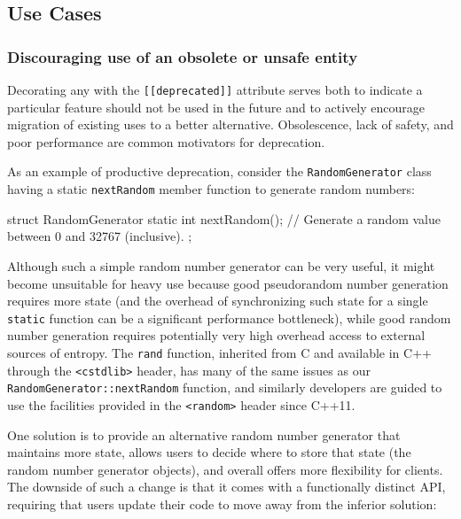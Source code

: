 \subsection[Use Cases]{Use Cases}\label{use-cases}

\subsubsection[Discouraging use of an obsolete or unsafe entity]{Discouraging use of an obsolete or unsafe entity}\label{discouraging-use-of-an-obsolete-or-unsafe-entity}

Decorating any  with the \lstinline![[deprecated]]! attribute serves both
to indicate a particular feature should not be used in the future and
to actively encourage migration of existing uses to a better
alternative. Obsolescence, lack of safety, and poor performance are
common motivators for deprecation.

As an example of productive deprecation, consider the
\lstinline!RandomGenerator! class having a static \lstinline!nextRandom!
member function to generate random numbers:

\newpage%
\begin{emcppslisting}
struct RandomGenerator
{
    static int nextRandom();
        // Generate a random value between 0 and 32767 (inclusive).
};
\end{emcppslisting}
    
\noindent Although such a simple random number generator can be very useful, it
might become unsuitable for heavy use because good pseudorandom number
generation requires more state (and the overhead of synchronizing such
state for a single \lstinline!static! function can be a significant
performance bottleneck), while good random number generation requires
potentially very high overhead access to external sources of
entropy. The \lstinline!rand! function, inherited from C and available in C++ through the \lstinline!<cstdlib>! header, has many of the same issues as our \lstinline!RandomGenerator::nextRandom!
function, and similarly developers are guided to use the facilities
  provided in the \lstinline!<random>! header since C++11. 
  
One
solution is to provide an alternative random number generator that
maintains more state, allows users to decide where to store that state
(the random number generator objects), and overall offers more
flexibility for clients. The downside of such a change is that it comes
with a functionally distinct API, requiring that users update their code
to move away from the inferior solution:

